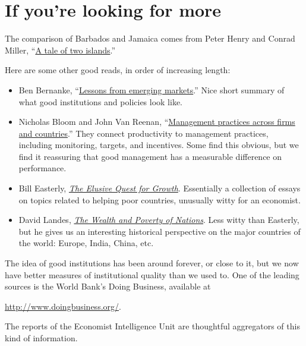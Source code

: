 \section*{If you're looking for more}

The comparison of Barbados and Jamaica comes from Peter Henry and Conrad Miller,
``\href{{http://www.aeaweb.org/articles.php?doi=10.1257/aer.99.2.261}}
{A tale of two islands}.''

Here are some other good reads, in order of increasing length:
\begin{itemize}
\item Ben Bernanke,
``\href{http://www.federalreserve.gov/newsevents/speech/Bernanke20110928a.htm}
{Lessons from emerging markets}.''
Nice short summary of what good institutions and policies look like.

\item Nicholas Bloom and John Van Reenan,
``\href{http://www.aeaweb.org/articles.php?doi=10.1257/jep.24.1.203}
    {Management practices across firms and countries}.''
They connect productivity to management practices, including
monitoring, targets, and incentives.
Some find this obvious, but we find it reassuring that
good management has a measurable difference
on performance.

\item Bill Easterly,
\href{http://www.amazon.com/Elusive-Quest-Growth-Economists-Misadventures/dp/0262550423}
{\it The Elusive Quest for Growth}.
Essentially a collection of essays on topics related to helping poor countries,
unusually witty for an economist.

\item David Landes,
\href{http://www.amazon.com/Wealth-Poverty-Nations-Some-Rich/dp/0393318885}
{\it The Wealth and Poverty of Nations}.
Less witty than Easterly, but he gives us an interesting historical
perspective on the major countries of the world:  Europe, India, China, etc.
\end{itemize}

The idea of good institutions has been around forever, or close to it,
but we now have better measures of institutional quality than we used to.
One of the leading sources is the World Bank's Doing Business, available at

\vspace*{\parskip}
\centerline{\url{http://www.doingbusiness.org/}.}

The reports of the Economist Intelligence Unit are thoughtful aggregators
of this kind of information.
